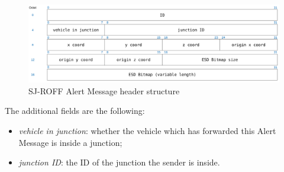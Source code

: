 		\begin{figure}[H]
			\centering
			\includegraphics[width=\textwidth]{immagini/sj-roffAlertHeader}
			\caption{SJ-ROFF Alert Message header structure}
			\label{fig:sj-roffAlertHeader}
		\end{figure}
		
		The additional fields are the following:
		\begin{itemize}
			\item  \textit{vehicle in junction}: whether the vehicle which has forwarded this Alert Message is inside a junction;
			\item \textit{junction ID}: the ID of the junction the sender is inside.
		\end{itemize}
		
	
		
		
		
	